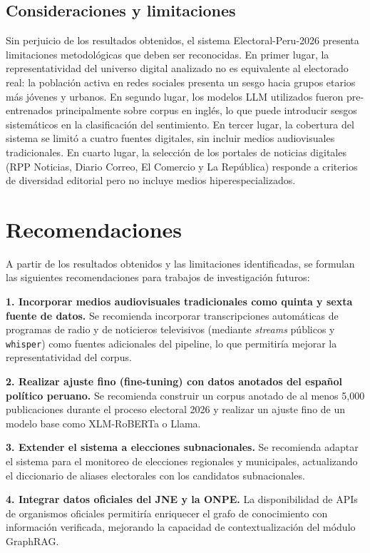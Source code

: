 \subsection*{Consideraciones y limitaciones}
Sin perjuicio de los resultados obtenidos, el sistema Electoral-Peru-2026 presenta limitaciones metodológicas que deben ser reconocidas. En primer lugar, la representatividad del universo digital analizado no es equivalente al electorado real: la población activa en redes sociales presenta un sesgo hacia grupos etarios más jóvenes y urbanos. En segundo lugar, los modelos LLM utilizados fueron pre-entrenados principalmente sobre corpus en inglés, lo que puede introducir sesgos sistemáticos en la clasificación del sentimiento. En tercer lugar, la cobertura del sistema se limitó a cuatro fuentes digitales, sin incluir medios audiovisuales tradicionales. En cuarto lugar, la selección de los portales de noticias digitales (RPP Noticias, Diario Correo, El Comercio y La República) responde a criterios de diversidad editorial pero no incluye medios hiperespecializados.

\section{Recomendaciones}
A partir de los resultados obtenidos y las limitaciones identificadas, se formulan las siguientes recomendaciones para trabajos de investigación futuros:

\textbf{1. Incorporar medios audiovisuales tradicionales como quinta y sexta fuente de datos.} Se recomienda incorporar transcripciones automáticas de programas de radio y de noticieros televisivos (mediante \textit{streams} públicos y \texttt{whisper}) como fuentes adicionales del pipeline, lo que permitiría mejorar la representatividad del corpus.

\textbf{2. Realizar ajuste fino (fine-tuning) con datos anotados del español político peruano.} Se recomienda construir un corpus anotado de al menos 5,000 publicaciones durante el proceso electoral 2026 y realizar un ajuste fino de un modelo base como XLM-RoBERTa o Llama.

\textbf{3. Extender el sistema a elecciones subnacionales.} Se recomienda adaptar el sistema para el monitoreo de elecciones regionales y municipales, actualizando el diccionario de aliases electorales con los candidatos subnacionales.

\textbf{4. Integrar datos oficiales del JNE y la ONPE.} La disponibilidad de APIs de organismos oficiales permitiría enriquecer el grafo de conocimiento con información verificada, mejorando la capacidad de contextualización del módulo GraphRAG.

